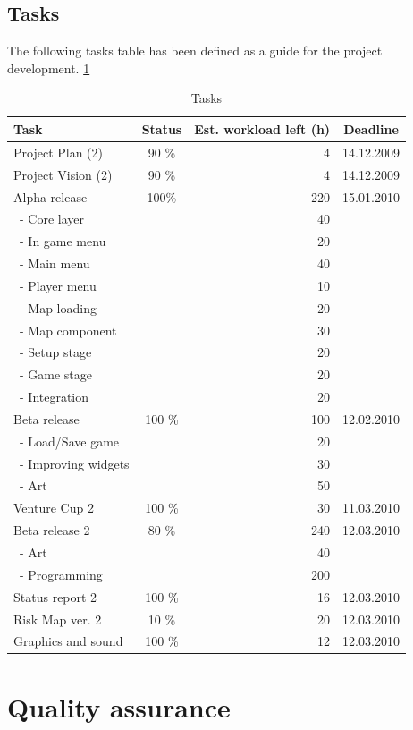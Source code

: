 \documentclass[12pt,a4paper]{article}
\begin{document}
\subsection{Tasks}

The following tasks table has been defined as a guide for the project development. \ref{tab:tasks}

\begin{table}[h!]
\small
\begin{tabular}{ l | c | r | c}
Task				&Status		&Est. workload left (h)	&Deadline \\\hline\hline
Project Plan (2) 	&90	\%		&4					&14.12.2009\\
Project Vision (2)	&90 	\%		&4					&14.12.2009\\
Alpha release		&100\%		&220				&15.01.2010\\
\ - Core layer		&			&40					&\\
\ - In game menu	&			&20					&\\
\ - Main menu		&			&40					&\\
\ - Player menu		&			&10					&\\
\ - Map loading		&			&20					&\\
\ - Map component	&			&30					&\\
\ - Setup stage		&			&20					&\\
\ - Game stage		&			&20					&\\
\ - Integration		&			&20					&\\
Beta release		&100 \%		&100				&12.02.2010\\
\ - Load/Save game	&			&20					&\\
\ - Improving widgets	&			&30					&\\
\ - Art				&			&50					&\\
Venture Cup 2		&100 \%		&30					&11.03.2010\\
Beta release 2		&80 \%		&240				&12.03.2010\\
\ - Art			&			&40					&\\
\ - Programming	&			&200				&\\
Status report 2		&100 \%		&16					&12.03.2010\\
Risk Map ver. 2	&10 \%		&20					&12.03.2010\\
Graphics and sound	&100 \%		&12					&12.03.2010
\end{tabular}
\caption{Tasks}
\label{tab:tasks}
\end{table}


\section{Quality assurance}
\end{document}
